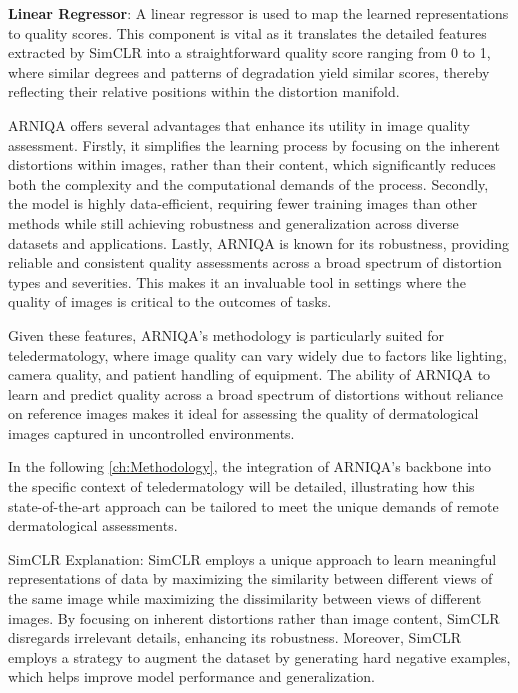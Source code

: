 \textbf{Linear Regressor}: A linear regressor is used to map the learned representations to quality scores. This component is vital as it translates the detailed features extracted by SimCLR into a straightforward quality score ranging from 0 to 1, where similar degrees and patterns of degradation yield similar scores, thereby reflecting their relative positions within the distortion manifold. \par
\vspace{\baselineskip}
\noindent
ARNIQA offers several advantages that enhance its utility in image quality assessment. Firstly, it simplifies the learning process by focusing on the inherent distortions within images, rather than their content, which significantly reduces both the complexity and the computational demands of the process. Secondly, the model is highly data-efficient, requiring fewer training images than other methods while still achieving robustness and generalization across diverse datasets and applications. Lastly, ARNIQA is known for its robustness, providing reliable and consistent quality assessments across a broad spectrum of distortion types and severities. This makes it an invaluable tool in settings where the quality of images is critical to the outcomes of tasks. \par
\vspace{\baselineskip}
\noindent
Given these features, ARNIQA's methodology is particularly suited for teledermatology, where image quality can vary widely due to factors like lighting, camera quality, and patient handling of equipment. The ability of ARNIQA to learn and predict quality across a broad spectrum of distortions without reliance on reference images makes it ideal for assessing the quality of dermatological images captured in uncontrolled environments. \par
\vspace{\baselineskip}
\noindent
In the following \autoref{ch:Methodology}, the integration of ARNIQA's backbone into the specific context of teledermatology will be detailed, illustrating how this state-of-the-art approach can be tailored to meet the unique demands of remote dermatological assessments. \par
\vspace{\baselineskip}
\noindent
SimCLR Explanation: SimCLR employs a unique approach to learn meaningful representations of data by maximizing the similarity between different views of the same image while maximizing the dissimilarity between views of different images. By focusing on inherent distortions rather than image content, SimCLR disregards irrelevant details, enhancing its robustness. Moreover, SimCLR employs a strategy to augment the dataset by generating hard negative examples, which helps improve model performance and generalization. \par

